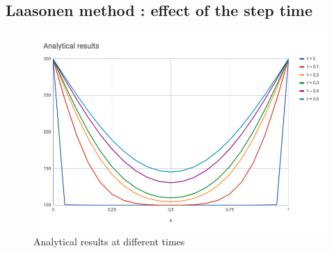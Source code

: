 \documentclass{article}
\begin{document}
        \subsection{Laasonen method : effect of the step time}
        \begin{figure}[H]
            \includegraphics[width=\textwidth]{analytical.png}
            \caption{Analytical results at different times}
        \end{figure}
\end{document}
